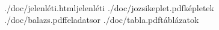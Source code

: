 {./doc/jelenléti.html}{jelenléti}
{./doc/jozsikeplet.pdf}{képletek}
{./doc/balazs.pdf}{feladatsor}
{./doc/tabla.pdf}{táblázatok}